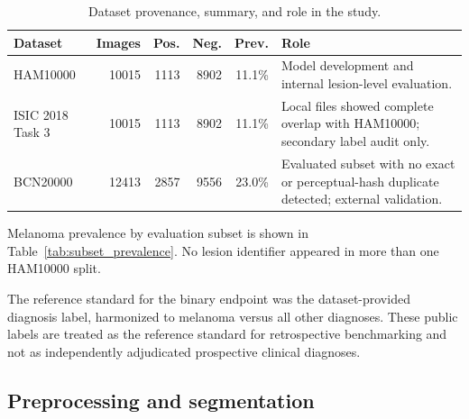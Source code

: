 \documentclass[preprint,12pt]{elsarticle}
\begin{document}
\begin{table}[htbp]
\centering
\caption{Dataset provenance, summary, and role in the study.}
\label{tab:dataset_provenance}
\small
\begin{tabularx}{\linewidth}{lrrrrY}
\toprule
Dataset & Images & Pos. & Neg. & Prev. & Role \\
\midrule
HAM10000 & 10015 & 1113 & 8902 & 11.1\% &
Model development and internal lesion-level evaluation. \\
ISIC 2018 Task 3 & 10015 & 1113 & 8902 & 11.1\% &
Local files showed complete overlap with HAM10000; secondary label audit only. \\
BCN20000 & 12413 & 2857 & 9556 & 23.0\% &
Evaluated subset with no exact or perceptual-hash duplicate detected; external validation. \\
\bottomrule
\end{tabularx}
\end{table}


Melanoma prevalence by evaluation subset is shown in Table~\ref{tab:subset_prevalence}. No lesion identifier appeared in more than one HAM10000 split.

\begin{table}[htbp]
\centering
\caption{Melanoma prevalence by evaluation subset.}
\label{tab:subset_prevalence}
\small
{}
\end{table}

The reference standard for the binary endpoint was the dataset-provided diagnosis label, harmonized to melanoma versus all other diagnoses. These public labels are treated as the reference standard for retrospective benchmarking and not as independently adjudicated prospective clinical diagnoses.

\subsection{Preprocessing and segmentation}
\end{document}
